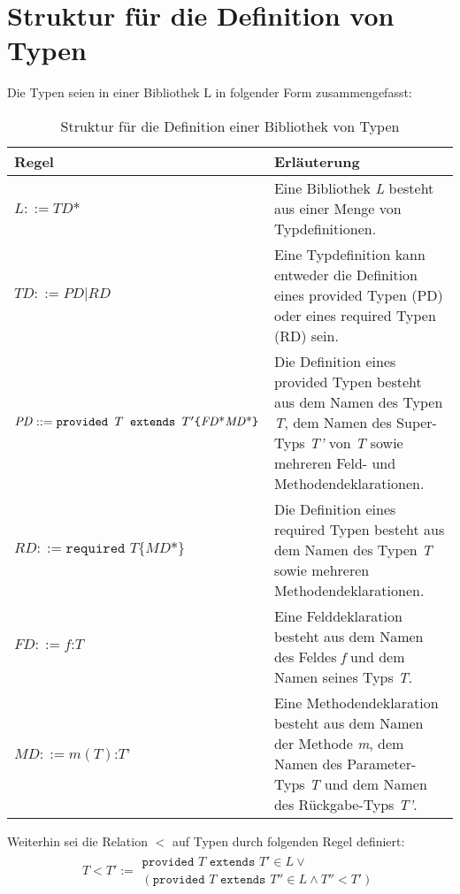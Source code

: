 \documentclass[a4paper,12pt]{article}
\begin{document}
\section{Struktur für die Definition von Typen}
Die Typen seien in einer Bibliothek $\text{L}$ in folgender Form zusammengefasst:
\begin{table}[H]
\centering
\begin{tabular}{|p{5.5cm}|p{8.5cm}|}
\hline
\hline
\centering\textbf{Regel} & \textbf{Erläuterung} \\
\hline
\hline
$\mathit{L} ::= \mathit{TD}\text{*}$ & Eine Bibliothek \emph{L} besteht aus einer Menge von Typdefinitionen.\\
\hline
$\mathit{TD} ::= \mathit{PD} | \mathit{RD}$ & Eine Typdefinition kann entweder die Definition eines provided Typen (PD) oder eines required Typen (RD) sein.\\
\hline
$\mathit{PD} ::= \newline\texttt{provided }T \texttt{ extends } T' \newline  \texttt{\{} \mathit{FD}\text{*} \mathit{MD}\text{*}\texttt{\}}$& Die Definition eines provided Typen besteht aus dem Namen des Typen \emph{T}, dem Namen des Super-Typs \emph{T'} von \emph{T} sowie mehreren Feld- und Methodendeklarationen.\\
\hline
$\mathit{RD} ::= \texttt{required } T \texttt{\{}\mathit{MD}\text{*}\texttt{\}}$ & Die Definition eines required Typen besteht aus dem Namen des Typen \emph{T} sowie mehreren Methodendeklarationen.\\
\hline
$\mathit{FD} ::= \mathit{f} \texttt{:} T$ & Eine Felddeklaration besteht aus dem Namen des Feldes \emph{f} und dem Namen seines Typs \emph{T}.\\
\hline
$\mathit{MD} ::= \mathit{m(T)}\texttt{:}\mathit{T}$' & Eine Methodendeklaration besteht aus dem Namen der Methode \emph{m}, dem Namen des Parameter-Typs \emph{T} und dem Namen des Rückgabe-Typs \emph{T'}.\\
\hline
\hline
\end{tabular}
\caption{Struktur für die Definition einer Bibliothek von Typen}
 \label{tab:eIShort}
\end{table}
\noindent
Weiterhin sei die Relation $<$ auf Typen durch folgenden Regel definiert:
\begin{gather*}
T < T' := \begin{array}{l}
	\texttt{provided }T \texttt{ extends } T' \in L \vee\\
	(\texttt{provided } T \texttt{ extends } T'' \in L \wedge T'' < T')
		\end{array}
\end{gather*}
\end{document}
